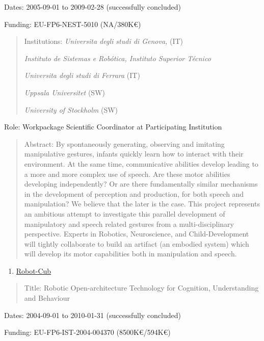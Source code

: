 \documentclass[
]{article}
\begin{document}
Dates: 2005-09-01 to 2009-02-28 (successfully concluded)

Funding: EU-FP6-NEST-5010 (NA/380K€)

\begin{quote}
Institutions: \emph{Universita degli studi di Genova,} (IT)

\emph{Instituto de Sistemas e Robótica, Instituto Superior Técnico}

\emph{Universita degli studi di Ferrara} (IT)

\emph{Uppsala Universitet} (SW)

\emph{University of Stockholm} (SW)
\end{quote}

Role: Workpackage Scientific Coordinator at Participating Institution

\begin{quote}
Abstract: By spontaneously generating, observing and imitating
manipulative gestures, infants quickly learn how to interact with their
environment. At the same time, communicative abilities develop leading
to a more and more complex use of speech. Are these motor abilities
developing independently? Or are there fundamentally similar mechanisms
in the development of perception and production, for both speech and
manipulation? We believe that the later is the case. This project
represents an ambitious attempt to investigate this parallel development
of manipulatory and speech related gestures from a multi-disciplinary
perspective. Experts in Robotics, Neuroscience, and Child-Development
will tightly collaborate to build an artifact (an embodied system) which
will develop its motor capabilities both in manipulation and speech.
\end{quote}

\begin{enumerate}
\def\labelenumi{\arabic{enumi}.}
\setcounter{enumi}{14}
\item
  \ul{Robot-Cub}
\end{enumerate}

\begin{quote}
Title: Robotic Open-architecture Technology for Cognition, Understanding
and Behaviour
\end{quote}

Dates: 2004-09-01 to 2010-01-31 (successfully concluded)

Funding: EU-FP6-IST-2004-004370 (8500K€/594K€)
\end{document}
